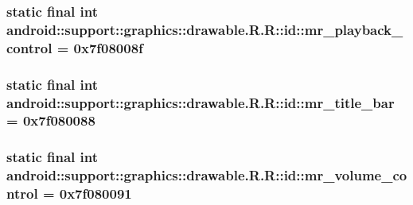 \hypertarget{classandroid_1_1support_1_1graphics_1_1drawable_1_1_r_1_1id_13fd2eec87dea1be2a782c282ba49f3e}{
\subsubsection[{mr\_\-playback\_\-control}]{\setlength{\rightskip}{0pt plus 5cm}static final int android::support::graphics::drawable.R.R::id::mr\_\-playback\_\-control = 0x7f08008f}}
\label{classandroid_1_1support_1_1graphics_1_1drawable_1_1_r_1_1id_13fd2eec87dea1be2a782c282ba49f3e}


\hypertarget{classandroid_1_1support_1_1graphics_1_1drawable_1_1_r_1_1id_db14230cfef5532faccaf592d9e8bd78}{
\subsubsection[{mr\_\-title\_\-bar}]{\setlength{\rightskip}{0pt plus 5cm}static final int android::support::graphics::drawable.R.R::id::mr\_\-title\_\-bar = 0x7f080088}}
\label{classandroid_1_1support_1_1graphics_1_1drawable_1_1_r_1_1id_db14230cfef5532faccaf592d9e8bd78}


\hypertarget{classandroid_1_1support_1_1graphics_1_1drawable_1_1_r_1_1id_e01d57c0f9ddc9491173ca7787ff2078}{
\subsubsection[{mr\_\-volume\_\-control}]{\setlength{\rightskip}{0pt plus 5cm}static final int android::support::graphics::drawable.R.R::id::mr\_\-volume\_\-control = 0x7f080091}}
\label{classandroid_1_1support_1_1graphics_1_1drawable_1_1_r_1_1id_e01d57c0f9ddc9491173ca7787ff2078}


